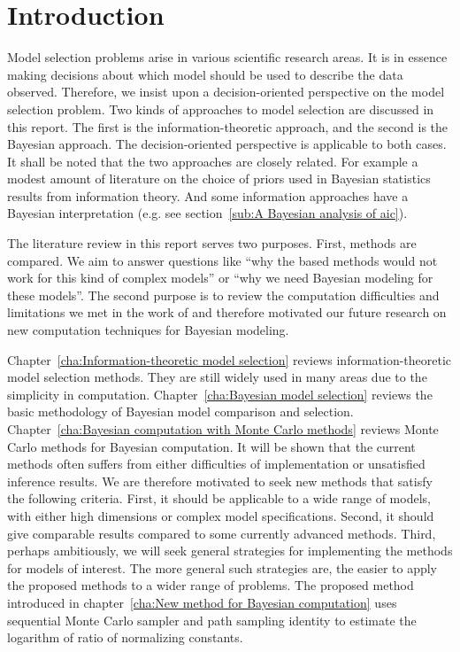 \chapter{Introduction}
\label{cha:Introduction}

Model selection problems arise in various scientific research areas. It is in
essence making decisions about which model should be used to describe the data
observed. Therefore, we insist upon a decision-oriented perspective on the
model selection problem. Two kinds of approaches to model selection are
discussed in this report. The first is the information-theoretic approach, and
the second is the Bayesian approach. The decision-oriented perspective is
applicable to both cases. It shall be noted that the two approaches are
closely related. For example a modest amount of literature on the choice of
priors used in Bayesian statistics results from information theory. And some
information approaches have a Bayesian interpretation (e.g. see
section~\ref{sub:A Bayesian analysis of aic}).

The literature review in this report serves two purposes. First, methods are
compared. We aim to answer questions like ``why the \aic based methods would
not work for this kind of complex models'' or ``why we need Bayesian modeling
for these models''. The second purpose is to review the computation
difficulties and limitations we met in the work of \textcite{Zhou:2011uo} and
therefore motivated our future research on new computation techniques for
Bayesian modeling.

Chapter~\ref{cha:Information-theoretic model selection} reviews
information-theoretic model selection methods. They are still widely used in
many areas due to the simplicity in computation. Chapter~\ref{cha:Bayesian
  model selection} reviews the basic methodology of Bayesian model comparison
and selection. Chapter~\ref{cha:Bayesian computation with Monte Carlo methods}
reviews Monte Carlo methods for Bayesian computation. It will be shown that
the current methods often suffers from either difficulties of implementation
or unsatisfied inference results. We are therefore motivated to seek new
methods that satisfy the following criteria. First, it should be applicable to
a wide range of models, with either high dimensions or complex model
specifications. Second, it should give comparable results compared to some
currently advanced methods. Third, perhaps ambitiously, we will seek general
strategies for implementing the methods for models of interest. The more
general such strategies are, the easier to apply the proposed methods to a
wider range of problems. The proposed method introduced in
chapter~\ref{cha:New method for Bayesian computation} uses sequential Monte
Carlo sampler and path sampling identity to estimate the logarithm of ratio of
normalizing constants.

